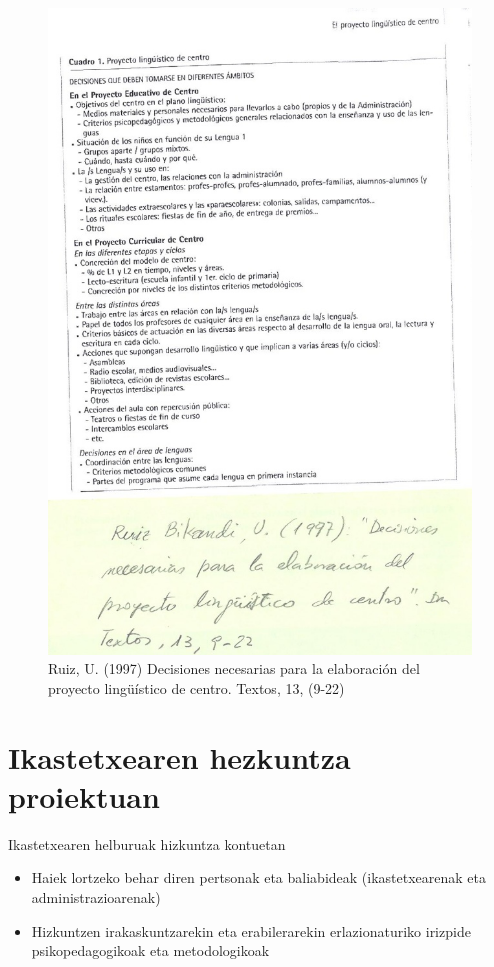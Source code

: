 \documentclass[
]{book}
\providecommand{\tightlist}{%
  \setlength{\itemsep}{0pt}\setlength{\parskip}{0pt}}
\begin{document}
\begin{figure}
\centering
\includegraphics{assets/3-img02.png}
\caption{Ruiz, U. (1997) Decisiones necesarias para la elaboración del proyecto lingüístico de centro. Textos, 13, (9-22)}
\end{figure}

\hypertarget{ikastetxearen-hezkuntza-proiektuan}{%
\section{Ikastetxearen hezkuntza proiektuan}\label{ikastetxearen-hezkuntza-proiektuan}}

Ikastetxearen helburuak hizkuntza kontuetan

\begin{itemize}
\tightlist
\item
  Haiek lortzeko behar diren pertsonak eta baliabideak (ikastetxearenak eta administrazioarenak)
\item
  Hizkuntzen irakaskuntzarekin eta erabilerarekin erlazionaturiko irizpide psikopedagogikoak eta metodologikoak
\end{itemize}
\end{document}
